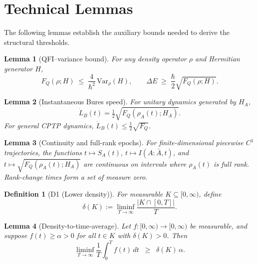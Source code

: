 \documentclass[10pt]{article}
\newtheorem{lemma}{Lemma}
\newtheorem{definition}{Definition}
\begin{document}
\section{Technical Lemmas}

The following lemmas establish the auxiliary bounds needed to derive the structural thresholds.

\begin{lemma}[QFI–variance bound]
For any density operator $\rho$ and Hermitian generator $H$,
\begin{equation}
F_Q(\rho;H) \;\leq\; \frac{4}{\hbar^2}\,\mathrm{Var}_\rho(H),
\qquad
\Delta E \;\geq\; \frac{\hbar}{2}\sqrt{F_Q(\rho;H)}.
\end{equation}
\label{lemma:qfi-var}
\end{lemma}

\begin{lemma}[Instantaneous Bures speed]
For unitary dynamics generated by $H_A$,
\begin{equation}
\dot{L}_B(t) = \tfrac{1}{2}\sqrt{F_Q(\rho_A(t); H_A)}.
\end{equation}
For general CPTP dynamics, $\dot{L}_B(t)\le \tfrac{1}{2}\sqrt{F_Q}$.
\label{lemma:bures-speed}
\end{lemma}

\begin{lemma}[Continuity and full-rank epochs]
For finite-dimensional piecewise $C^1$ trajectories, the functions
$t\mapsto S_A(t)$, $t\mapsto I(A:\bar{A},t)$, and
$t\mapsto \sqrt{F_Q(\rho_A(t);H_A)}$
are continuous on intervals where $\rho_A(t)$ is full rank.
Rank-change times form a set of measure zero.
\label{lemma:continuity}
\end{lemma}

\begin{definition}[D1 (Lower density)]
For measurable $K\subseteq [0,\infty)$, define
\begin{equation}
\delta(K) := \liminf_{T\to\infty} \frac{|K\cap [0,T]|}{T}.
\end{equation}
\end{definition}

\begin{lemma}[Density-to-time-average]
Let $f:[0,\infty)\to [0,\infty)$ be measurable, and suppose $f(t)\ge \alpha>0$
for all $t\in K$ with $\delta(K)>0$. Then
\begin{equation}
\liminf_{T\to\infty}\frac{1}{T}\int_0^T f(t)\,dt \;\;\geq\;\; \delta(K)\,\alpha.
\end{equation}
\label{lemma:density}
\end{lemma}
\end{document}
